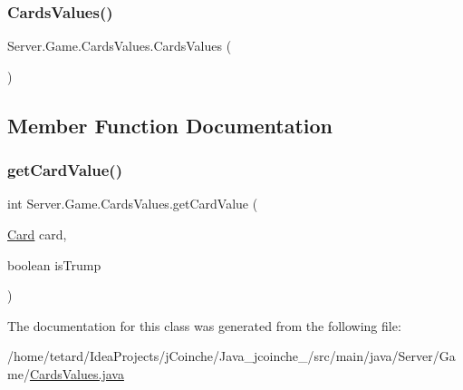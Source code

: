 \subsubsection{\texorpdfstring{Cards\+Values()}{CardsValues()}}
{\footnotesize\ttfamily Server.\+Game.\+Cards\+Values.\+Cards\+Values (\begin{DoxyParamCaption}{ }\end{DoxyParamCaption})\hspace{0.3cm}{\ttfamily [inline]}}



\subsection{Member Function Documentation}
\mbox{\label{classServer_1_1Game_1_1CardsValues_a9565f977853cc769004d989b3f9524c6}} 
\subsubsection{\texorpdfstring{get\+Card\+Value()}{getCardValue()}}
{\footnotesize\ttfamily int Server.\+Game.\+Cards\+Values.\+get\+Card\+Value (\begin{DoxyParamCaption}\item[{\mbox{\hyperlink{classCommon_1_1Card}{Card}}}]{card,  }\item[{boolean}]{is\+Trump }\end{DoxyParamCaption})\hspace{0.3cm}{\ttfamily [inline]}}



The documentation for this class was generated from the following file\+:\begin{DoxyCompactItemize}
\item 
/home/tetard/\+Idea\+Projects/j\+Coinche/\+Java\+\_\+jcoinche\+\_/src/main/java/\+Server/\+Game/\mbox{\hyperlink{CardsValues_8java}{Cards\+Values.\+java}}\end{DoxyCompactItemize}
